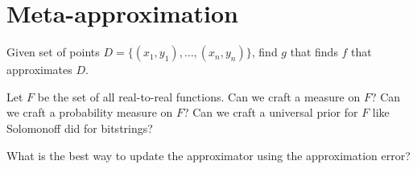 \section{Meta-approximation}

Given set of points
\(D = \{(x_1,y_1),\ldots,(x_n,y_n)\}\),
find \(g\) that finds \(f\) that approximates \(D\).

Let \(F\) be the set of all real-to-real functions.
Can we craft a measure on \(F\)?
Can we craft a probability measure on \(F\)?
Can we craft a universal prior for \(F\) like Solomonoff did for bitstrings?

What is the best way to update the approximator using the approximation error?
